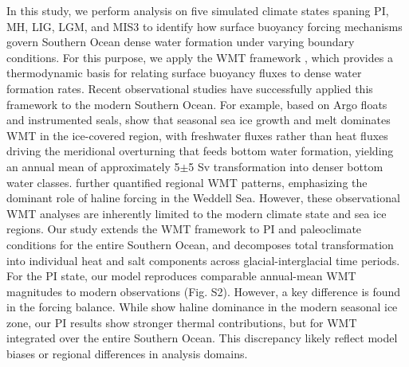 \documentclass[draft]{agujournal2025}
\begin{document}
In this study, we perform analysis on five simulated climate states spaning PI, MH, LIG, LGM, and MIS3 to identify how surface buoyancy forcing mechanisms govern Southern Ocean dense water formation under varying boundary conditions. For this purpose, we apply the WMT framework \citep{Walin1982,Groeskamp2019,drake2025water}, which  provides a thermodynamic basis for relating surface buoyancy fluxes to dense water formation rates. Recent observational studies have successfully applied this framework to the modern Southern Ocean. For example, based on Argo floats and instrumented seals, \citet{Pellichero2018} show that seasonal sea ice growth and melt dominates WMT in the ice-covered region, with freshwater fluxes rather than heat fluxes driving the meridional overturning that feeds bottom water formation, yielding an annual mean of approximately 5$\pm$5 Sv transformation into denser bottom water classes. \citet{Bailey2023} further quantified regional WMT patterns, emphasizing the dominant role of haline forcing in the Weddell Sea. However, these observational WMT analyses are inherently limited to the modern climate state and sea ice regions. Our study extends the WMT framework to PI and paleoclimate conditions for the entire Southern Ocean, and decomposes total transformation into individual heat and salt components across glacial-interglacial time periods. For the PI state, our model reproduces comparable annual-mean WMT magnitudes to modern observations (Fig. S2). However, a key difference is found in the forcing balance. While \citet{Pellichero2018,Bailey2023} show haline dominance in the modern seasonal ice zone, our PI results show stronger thermal contributions, but for WMT integrated over the entire Southern Ocean. This discrepancy likely reflect model biases or regional differences in analysis domains.
\end{document}
